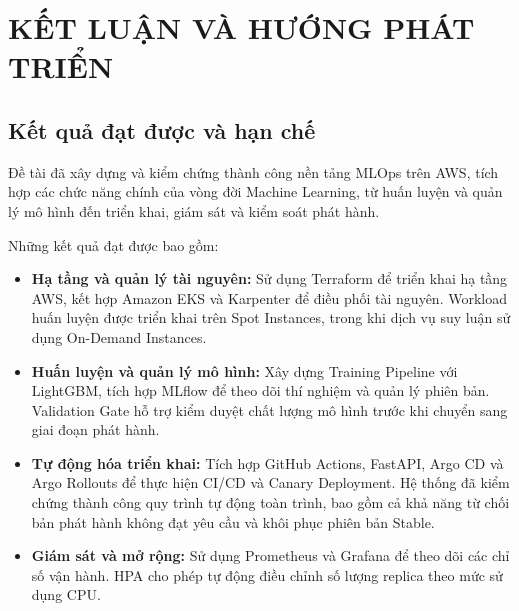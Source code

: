 

\FloatBarrier


\section{KẾT LUẬN VÀ HƯỚNG PHÁT TRIỂN}


\subsection{Kết quả đạt được và hạn chế}


Đề tài đã xây dựng và kiểm chứng thành công nền tảng MLOps trên AWS, tích hợp các chức năng chính của vòng đời Machine Learning, từ huấn luyện và quản lý mô hình đến triển khai, giám sát và kiểm soát phát hành.


Những kết quả đạt được bao gồm:


\begin{itemize}

\item 

\textbf{Hạ tầng và quản lý tài nguyên:} Sử dụng Terraform để triển khai hạ tầng AWS, kết hợp Amazon EKS và Karpenter để điều phối tài nguyên. Workload huấn luyện được triển khai trên Spot Instances, trong khi dịch vụ suy luận sử dụng On-Demand Instances.


\item 

\textbf{Huấn luyện và quản lý mô hình:} Xây dựng Training Pipeline với LightGBM, tích hợp MLflow để theo dõi thí nghiệm và quản lý phiên bản. Validation Gate hỗ trợ kiểm duyệt chất lượng mô hình trước khi chuyển sang giai đoạn phát hành.


\item 

\textbf{Tự động hóa triển khai:} Tích hợp GitHub Actions, FastAPI, Argo CD và Argo Rollouts để thực hiện CI/CD và Canary Deployment. Hệ thống đã kiểm chứng thành công quy trình tự động toàn trình, bao gồm cả khả năng từ chối bản phát hành không đạt yêu cầu và khôi phục phiên bản Stable.


\item 

\textbf{Giám sát và mở rộng:} Sử dụng Prometheus và Grafana để theo dõi các chỉ số vận hành. HPA cho phép tự động điều chỉnh số lượng replica theo mức sử dụng CPU.


\end{itemize}

